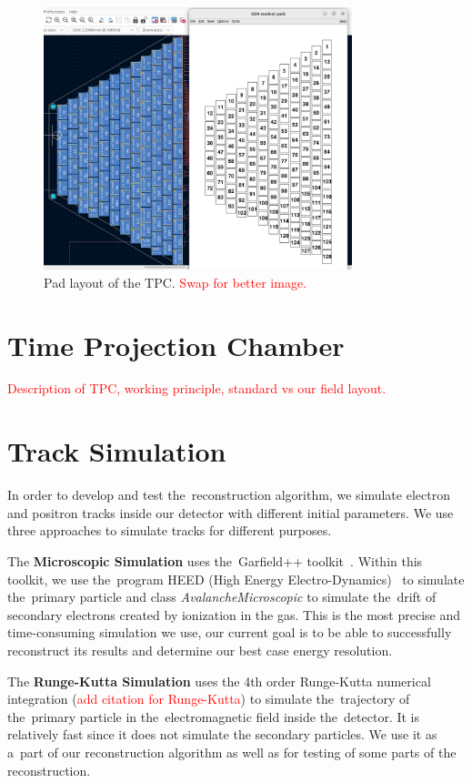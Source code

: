\documentclass[]{article}
\begin{document}
			\begin{figure}
				\centering
				\includegraphics[width=0.8\textwidth]{padlayout.png}
				\caption{Pad layout of the TPC. \textcolor{red}{Swap for better image.}}
				\label{fig:padlayout}
			\end{figure}
	
	\section{Time Projection Chamber}
	\label{sec:tpc}
		\textcolor{red}{Description of TPC, working principle, standard vs our field layout.}
		
	\section{Track Simulation}
		In order to develop and test the~reconstruction algorithm, we simulate electron and positron tracks inside our detector with different initial parameters. We use three approaches to simulate tracks for different purposes.
		
		The \textbf{Microscopic Simulation} uses the~Garfield++ toolkit~\cite{Garfield++}. Within this toolkit, we use the~program HEED (High Energy Electro-Dynamics)~\cite{HEED} to simulate the~primary particle and class \textit{AvalancheMicroscopic} to simulate the~drift of secondary electrons created by ionization in the gas. This is the most precise and time-consuming simulation we use, our current goal is to be able to successfully reconstruct its results and determine our best case energy resolution.
		
		The \textbf{Runge-Kutta Simulation} uses the 4th order Runge-Kutta numerical integration (\textcolor{red}{add citation for Runge-Kutta}) to simulate the~trajectory of the~primary particle in the~electromagnetic field inside the~detector. It is relatively fast since it does not simulate the secondary particles. We use it as a~part of our reconstruction algorithm as well as for testing of some parts of the reconstruction.
		
\end{document}
